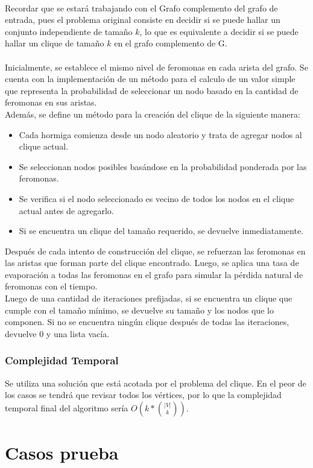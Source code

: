 \documentclass{article}
\begin{document}
\\
Recordar que se estará trabajando con el Grafo complemento del grafo de entrada, pues el problema original consiste en decidir si se puede hallar un conjunto independiente de tamaño $k$, lo que es equivalente a decidir si se puede hallar un clique de tamaño $k$ en el grafo complemento de G.
\\
\\
Inicialmente, se establece el mismo nivel de feromonas en cada arista del grafo. Se cuenta con la implementación de un método para el calculo de un valor simple que representa la probabilidad de seleccionar un nodo basado en la cantidad de feromonas en sus aristas.
\\
Además, se define un método para la creación del clique de la siguiente manera:
\begin{itemize}
    \item Cada hormiga comienza desde un nodo aleatorio y trata de agregar nodos al clique actual.
    \item Se seleccionan nodos posibles basándose en la probabilidad ponderada por las feromonas.
    \item Se verifica si el nodo seleccionado es vecino de todos los nodos en el clique actual antes de agregarlo.
    \item Si se encuentra un clique del tamaño requerido, se devuelve inmediatamente.
\end{itemize}
Después de cada intento de construcción del clique, se refuerzan las feromonas en las aristas que forman parte del clique encontrado. Luego, se aplica una tasa de evaporación a todas las feromonas en el grafo para simular la pérdida natural de feromonas con el tiempo.
\\
Luego de una cantidad de iteraciones prefijadas, si se encuentra un clique que cumple con el tamaño mínimo, se devuelve su tamaño y los nodos que lo componen. Si no se encuentra ningún clique después de todas las iteraciones, devuelve 0 y una lista vacía.

\subsubsection{Complejidad Temporal}
Se utiliza una solución que está acotada por el problema del clique. En el peor de los casos se tendrá que revisar todos los vértices, por lo que la complejidad temporal final del algoritmo sería $O(k* {|V| \choose k})$.

\section{Casos prueba}
\end{document}

